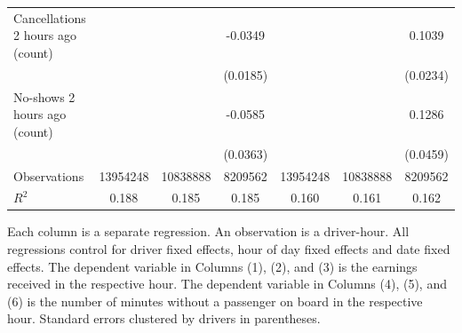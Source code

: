\documentclass[reviewmode]{AEA}
\begin{document}
\begin{table}
{\begin{tabularx}{\textwidth}{l@{\extracolsep{\fill}}*{6}{S}}
			Cancellations 2 hours ago (count)&                     &                     &     -0.0349  &                     &                     &      0.1039\\
			                    &                     &                     &    (0.0185)         &                     &                     &    (0.0234)         \\
			\addlinespace
			No-shows 2 hours ago (count)&                     &                     &     -0.0585         &                     &                     &      0.1286\\
			                    &                     &                     &    (0.0363)         &                     &                     &    (0.0459)         \\
			\addlinespace
			Observations        &\num{13954248}         &\num{10838888}         &\num{8209562}         &\num{13954248}         &\num{10838888}         &\num{8209562}         \\
			$R^2$             &     {0.188}         &     {0.185}         &     {0.185}         &     {0.160}         &     {0.161}         &     {0.162}         \\
			\bottomrule
			\end{tabularx}
			}
			\begin{tablenotes}
				Each column is a separate regression. An observation is a driver-hour. All regressions control for driver fixed effects, hour of day fixed effects and date fixed effects. The dependent variable in Columns (1), (2), and (3) is the earnings received in the respective hour. The dependent variable in Columns (4), (5), and (6) is the number of minutes without a passenger on board in the respective hour. Standard errors clustered by drivers in parentheses.
			\end{tablenotes}
%


\end{table}
\end{document}
